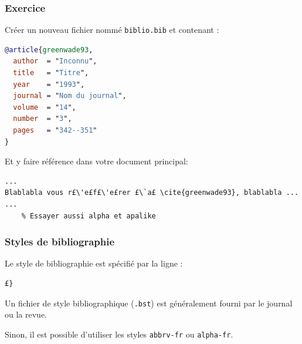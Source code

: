 \documentclass{beamer}
\begin{document}
\begin{frame}[fragile]
\frametitle{Exercice}

Créer un nouveau fichier nommé \texttt{biblio.bib} et contenant :

\begin{lstlisting}[language=BibTeX]
@article{greenwade93,
  author  = "Inconnu",
  title   = "Titre",
  year    = "1993",
  journal = "Nom du journal",
  volume  = "14",
  number  = "3",
  pages   = "342--351"
}
\end{lstlisting}

Et y faire référence dans votre document principal:

\begin{lstlisting}
...
Blablabla vous r£\'e£f£\'e£rer £\`a£ \cite{greenwade93}, blablabla ...
...
    % Essayer aussi alpha et apalike

\end{lstlisting}

\end{frame}


\begin{frame}[fragile]
\frametitle{Styles de bibliographie}

Le style de bibliographie est spécifié par la ligne :

\begin{lstlisting}
£}
\end{lstlisting}

Un fichier de style bibliographique (\texttt{.bst}) est généralement fourni par le journal ou la revue.

Sinon, il est possible d'utiliser les styles \texttt{abbrv-fr} ou \texttt{alpha-fr}.
\end{frame}

\end{document}
